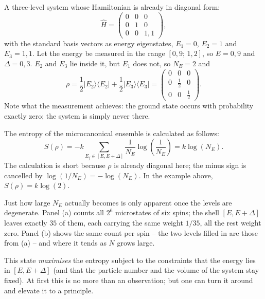 \begin{example}
  A three-level system whose Hamiltonian is already in diagonal form:
  \begin{equation}
    \widehat{H} = \begin{pmatrix} 0 & 0 & 0\\ 0 & 1 & 0\\ 0 & 0 & 1{,}1\end{pmatrix},
  \end{equation}
  with the standard basis vectors as energy eigenstates, $E_1 = 0$, $E_2 = 1$ and $E_3 = 1{,}1$. Let the energy be measured in the range $[0{,}9;\, 1{,}2]$, so $E = 0{,}9$ and $\Delta = 0{,}3$. $E_2$ and $E_3$ lie inside it, but $E_1$ does not, so $N_E = 2$ and
  \begin{equation}
    \rho = \frac{1}{2}|E_2\rangle\langle E_2| + \frac{1}{2}|E_3\rangle\langle E_3|
         = \begin{pmatrix} 0 & 0 & 0\\ 0 & \frac{1}{2} & 0\\ 0 & 0 & \frac{1}{2}\end{pmatrix}.
  \end{equation}
  Note what the measurement achieves: the ground state occurs with probability exactly zero; the system is simply never there.
\end{example}

The entropy of the microcanonical ensemble is calculated as follows:
\begin{equation}
  S(\rho) = -k\sum_{E_j\in [E,E+\Delta]} \frac{1}{N_E} \log\left(\frac{1}{N_E}\right) = k \log(N_E).
\end{equation}
The calculation is short because $\rho$ is already diagonal here; the minus sign is cancelled by $\log(1/N_E) = -\log(N_E)$. In the example above, $S(\rho) = k\log(2)$.



Just how large $N_E$ actually becomes is only apparent once the levels are degenerate. Panel (a) counts all $2^6$ microstates of six spins; the shell $[E,E+\Delta]$ leaves exactly $35$ of them, each carrying the same weight $1/35$, all the rest weight zero. Panel (b) shows the same count per spin -- the two levels filled in are those from (a) -- and where it tends as $N$ grows large.

This state \emph{maximises} the entropy subject to the constraints that the energy lies in $[E,E+\Delta]$ (and that the particle number and the volume of the system stay fixed). At first this is no more than an observation; but one can turn it around and elevate it to a principle.

